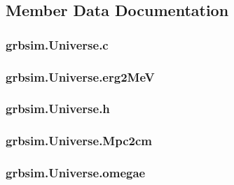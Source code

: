 \subsection{Member Data Documentation}
\hypertarget{classgrbsim_1_1_universe_ad5dd40bbc7e6a2371cf1515b4fa3d59f}{
\subsubsection[{c}]{\setlength{\rightskip}{0pt plus 5cm}grbsim.\-Universe.\-c}}\label{classgrbsim_1_1_universe_ad5dd40bbc7e6a2371cf1515b4fa3d59f}
\hypertarget{classgrbsim_1_1_universe_afc9d348bf0da237becec80a8ba758121}{
\subsubsection[{erg2\-Me\-V}]{\setlength{\rightskip}{0pt plus 5cm}grbsim.\-Universe.\-erg2\-Me\-V}}\label{classgrbsim_1_1_universe_afc9d348bf0da237becec80a8ba758121}
\hypertarget{classgrbsim_1_1_universe_a59f1abb2ade1948560357a1fd28bbaeb}{
\subsubsection[{h}]{\setlength{\rightskip}{0pt plus 5cm}grbsim.\-Universe.\-h}}\label{classgrbsim_1_1_universe_a59f1abb2ade1948560357a1fd28bbaeb}
\hypertarget{classgrbsim_1_1_universe_a0510b25f83d19c1573caa988326f35e5}{
\subsubsection[{Mpc2cm}]{\setlength{\rightskip}{0pt plus 5cm}grbsim.\-Universe.\-Mpc2cm}}\label{classgrbsim_1_1_universe_a0510b25f83d19c1573caa988326f35e5}
\hypertarget{classgrbsim_1_1_universe_a84f0d8f958e91a15d3a88263df6dbdeb}{
\subsubsection[{omegae}]{\setlength{\rightskip}{0pt plus 5cm}grbsim.\-Universe.\-omegae}}\label{classgrbsim_1_1_universe_a84f0d8f958e91a15d3a88263df6dbdeb}
